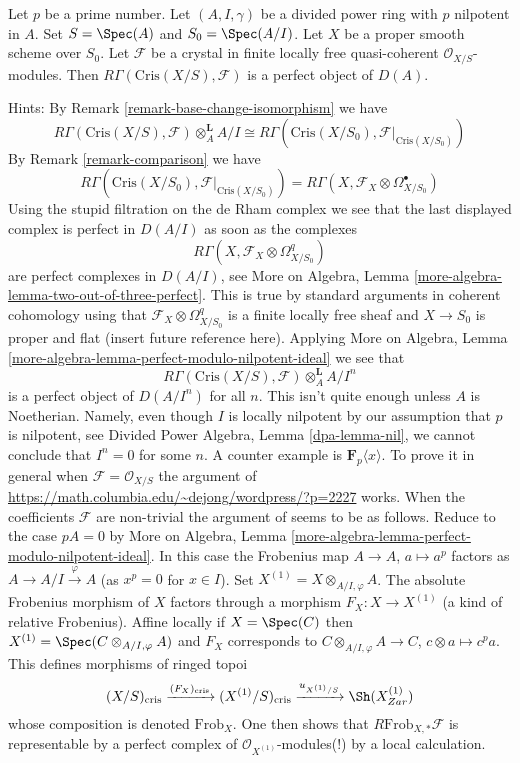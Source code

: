\begin{remark}[Perfectness]
\label{remark-perfect}
Let $p$ be a prime number. Let $(A, I, \gamma)$ be a divided power
ring with $p$ nilpotent in $A$. Set $S = \Spec(A)$ and
$S_0 = \Spec(A/I)$. Let $X$ be a proper smooth scheme over $S_0$.
Let $\mathcal{F}$ be a crystal in finite locally free
quasi-coherent $\mathcal{O}_{X/S}$-modules.
Then $R\Gamma(\text{Cris}(X/S), \mathcal{F})$ is a
perfect object of $D(A)$.

\medskip\noindent
Hints: By Remark \ref{remark-base-change-isomorphism} we have
$$
R\Gamma(\text{Cris}(X/S), \mathcal{F}) \otimes_A^\mathbf{L} A/I
\cong
R\Gamma(\text{Cris}(X/S_0), \mathcal{F}|_{\text{Cris}(X/S_0)})
$$
By Remark \ref{remark-comparison} we have
$$
R\Gamma(\text{Cris}(X/S_0), \mathcal{F}|_{\text{Cris}(X/S_0)}) =
R\Gamma(X, \mathcal{F}_X \otimes \Omega^\bullet_{X/S_0})
$$
Using the stupid filtration on the de Rham complex we see that
the last displayed complex is perfect in $D(A/I)$ as soon as the complexes
$$
R\Gamma(X, \mathcal{F}_X \otimes \Omega^q_{X/S_0})
$$
are perfect complexes in $D(A/I)$, see
More on Algebra, Lemma \ref{more-algebra-lemma-two-out-of-three-perfect}.
This is true by standard arguments
in coherent cohomology using that $\mathcal{F}_X \otimes \Omega^q_{X/S_0}$
is a finite locally free sheaf and $X \to S_0$ is proper and flat
(insert future reference here). Applying
More on Algebra, Lemma \ref{more-algebra-lemma-perfect-modulo-nilpotent-ideal}
we see that
$$
R\Gamma(\text{Cris}(X/S), \mathcal{F}) \otimes_A^\mathbf{L} A/I^n
$$
is a perfect object of $D(A/I^n)$ for all $n$. This isn't quite enough
unless $A$ is Noetherian. Namely, even though $I$ is locally nilpotent
by our assumption that $p$ is nilpotent, see
Divided Power Algebra, Lemma \ref{dpa-lemma-nil},
we cannot conclude that $I^n = 0$ for some $n$. A counter example
is $\mathbf{F}_p\langle x \rangle$. To prove it in general when
$\mathcal{F} = \mathcal{O}_{X/S}$ the argument of
\url{https://math.columbia.edu/~dejong/wordpress/?p=2227}
works. When the coefficients $\mathcal{F}$ are non-trivial the
argument of \cite{Faltings-very} seems to be as follows. Reduce to the
case $pA = 0$ by More on Algebra, Lemma
\ref{more-algebra-lemma-perfect-modulo-nilpotent-ideal}.
In this case the Frobenius map $A \to A$, $a \mapsto a^p$ factors
as $A \to A/I \xrightarrow{\varphi} A$ (as $x^p = 0$ for $x \in I$). Set
$X^{(1)} = X \otimes_{A/I, \varphi} A$. The absolute Frobenius morphism
of $X$ factors through a morphism $F_X : X \to X^{(1)}$ (a kind of
relative Frobenius). Affine locally if $X = \Spec(C)$ then
$X^{(1)} = \Spec( C \otimes_{A/I, \varphi} A)$
and $F_X$ corresponds to $C \otimes_{A/I, \varphi} A \to C$,
$c \otimes a \mapsto c^pa$. This defines morphisms of ringed topoi
$$
(X/S)_{\text{cris}}
\xrightarrow{(F_X)_{\text{cris}}}
(X^{(1)}/S)_{\text{cris}}
\xrightarrow{u_{X^{(1)}/S}}
\Sh(X^{(1)}_{Zar})
$$
whose composition is denoted $\text{Frob}_X$. One then shows that
$R\text{Frob}_{X, *}\mathcal{F}$ is representable by a
perfect complex of $\mathcal{O}_{X^{(1)}}$-modules(!)
by a local calculation.
\end{remark}

